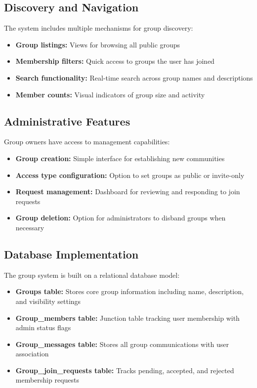 \documentclass{article}
\begin{document}
\subsection{Discovery and Navigation}
The system includes multiple mechanisms for group discovery:
\begin{itemize}
    \item \textbf{Group listings:} Views for browsing all public groups
    \item \textbf{Membership filters:} Quick access to groups the user has joined
    \item \textbf{Search functionality:} Real-time search across group names and descriptions
    \item \textbf{Member counts:} Visual indicators of group size and activity
\end{itemize}

\subsection{Administrative Features}
Group owners have access to management capabilities:
\begin{itemize}
    \item \textbf{Group creation:} Simple interface for establishing new communities
    \item \textbf{Access type configuration:} Option to set groups as public or invite-only
    \item \textbf{Request management:} Dashboard for reviewing and responding to join requests
    \item \textbf{Group deletion:} Option for administrators to disband groups when necessary
\end{itemize}

\subsection{Database Implementation}
The group system is built on a relational database model:
\begin{itemize}
    \item \textbf{Groups table:} Stores core group information including name, description, and visibility settings
    \item \textbf{Group\_members table:} Junction table tracking user membership with admin status flags
    \item \textbf{Group\_messages table:} Stores all group communications with user association
    \item \textbf{Group\_join\_requests table:} Tracks pending, accepted, and rejected membership requests
\end{itemize}
\end{document}
